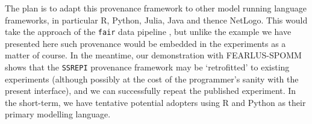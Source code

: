 \documentclass[runningheads]{llncs}
\begin{document}
The plan is to adapt this provenance framework to other model running language
frameworks, in particular R, Python, Julia, Java and thence NetLogo. This would
take the approach of the \texttt{fair} data pipeline \cite{mitchell2022fair}, but unlike
the example we have presented here such provenance would be embedded in the
experiments as a matter of course. In the meantime, our demonstration with FEARLUS-SPOMM shows that the \texttt{SSREPI} provenance framework may be `retrofitted' to existing
experiments (although possibly at the cost of the programmer's sanity with the present interface), and we can successfully repeat the published experiment. In the short-term, we have tentative potential adopters using R and Python as their primary modelling language.

%
%


% 
%
\end{document}

